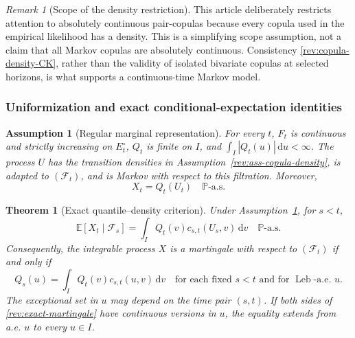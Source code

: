 \documentclass[11pt]{article}
\newtheorem{assumption}[definition]{Assumption}
\newtheorem{theorem}[definition]{Theorem}
\theoremstyle{remark}
\newtheorem{remark}[definition]{Remark}
\newcommand{\E}{\mathbb E}
\newcommand{\Pp}{\mathbb P}
\newcommand{\dd}{\,\mathrm d}
\newcommand{\Leb}{\operatorname{Leb}}
\begin{document}
\begin{remark}[Scope of the density restriction]
This article deliberately restricts attention to absolutely continuous
pair-copulas because every copula used in the empirical likelihood has a
density.  This is a simplifying scope assumption, not a claim that all Markov
copulas are absolutely continuous.  Consistency
\eqref{rev:copula-density-CK}, rather than the validity of isolated bivariate
copulas at selected horizons, is what supports a continuous-time Markov model.
\end{remark}

\subsubsection{Uniformization and exact conditional-expectation identities}

\begin{assumption}[Regular marginal representation]
\label{rev:ass-marginal}
For every $t$, $F_t$ is continuous and strictly increasing on $E_t^\circ$,
$Q_t$ is finite on $I$, and $\int_I|Q_t(u)|\dd u<\infty$.  The process $U$ has
the transition densities in Assumption~\ref{rev:ass-copula-density}, is
adapted to $(\mathcal F_t)$, and is Markov with respect to this filtration.
Moreover,
\begin{equation}
X_t=Q_t(U_t)\quad\Pp\text{-a.s.}
\label{rev:uniformization}
\end{equation}
\end{assumption}

\begin{theorem}[Exact quantile--density criterion]
\label{rev:thm-exact-density}
Under Assumption~\ref{rev:ass-marginal}, for $s<t$,
\begin{equation}
\E[X_t\mid\mathcal F_s]
=\int_IQ_t(v)c_{s,t}(U_s,v)\dd v
\quad\Pp\text{-a.s.}
\label{rev:conditional-quantile}
\end{equation}
Consequently, the integrable process $X$ is a martingale with respect to
$(\mathcal F_t)$ if and only if
\begin{equation}
Q_s(u)=\int_IQ_t(v)c_{s,t}(u,v)\dd v
\quad\text{for each fixed }s<t\text{ and for }\Leb\text{-a.e. }u.
\label{rev:exact-martingale}
\end{equation}
The exceptional set in $u$ may depend on the time pair $(s,t)$.  If both sides
of \eqref{rev:exact-martingale} have continuous versions in $u$, the equality
extends from a.e. $u$ to every $u\in I$.
\end{theorem}
\end{document}
